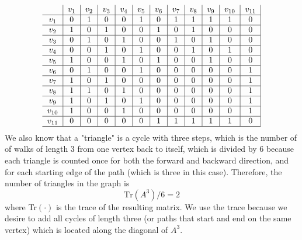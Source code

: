 \documentclass{article}
\begin{document}
\begin{equation*}
	\begin{tabular}{c | c | c | c | c | c | c | c | c | c | c | c |}
		        & $v_1$ & $v_2$ & $v_3$ & $v_4$ & $v_5$ & $v_6$ & $v_7$ & $v_8$ & $v_9$ & $v_{10}$ & $v_{11}$ \\ \hline
		$v_1$   & 0     & 1     & 0     & 0     & 1     & 0     & 1     & 1     & 1     & 1        & 0        \\ \hline
		$v_2$   & 1     & 0     & 1     & 0     & 0     & 1     & 0     & 1     & 0     & 0        & 0        \\ \hline
		$v_3$   & 0     & 1     & 0     & 1     & 0     & 0     & 1     & 0     & 1     & 0        & 0        \\ \hline
		$v_4$   & 0     & 0     & 1     & 0     & 1     & 0     & 0     & 1     & 0     & 1        & 0        \\ \hline
		$v_5$   & 1     & 0     & 0     & 1     & 0     & 1     & 0     & 0     & 1     & 0        & 0        \\ \hline
		$v_6$   & 0     & 1     & 0     & 0     & 1     & 0     & 0     & 0     & 0     & 0        & 1        \\ \hline
		$v_7$   & 1     & 0     & 1     & 0     & 0     & 0     & 0     & 0     & 0     & 0        & 1        \\ \hline
		$v_8$   & 1     & 1     & 0     & 1     & 0     & 0     & 0     & 0     & 0     & 0        & 1        \\ \hline
		$v_9$   & 1     & 0     & 1     & 0     & 1     & 0     & 0     & 0     & 0     & 0        & 1        \\ \hline
		$v_{10}$& 1     & 0     & 0     & 1     & 0     & 0     & 0     & 0     & 0     & 0        & 1        \\ \hline
		$v_{11}$& 0     & 0     & 0     & 0     & 0     & 1     & 1     & 1     & 1     & 1        & 0        \\ \hline
	\end{tabular}
\end{equation*}
We also know that a "triangle" is a cycle with three steps, which is the number of of walks of length $3$ from one vertex back to itself, which is divided by 6 because each triangle is counted once for both the forward and backward direction, and for each starting edge of the path (which is three in this case).  Therefore, the number of triangles in the graph is 
\begin{equation*}
	\text{Tr}(A^3)/6 = 2
\end{equation*}
where Tr$(\cdot)$ is the trace of the resulting matrix.  We use the trace because we desire to add all cycles of length three (or paths that start and end on the same vertex) which is located along the diagonal of $A^3$.
\end{document}
